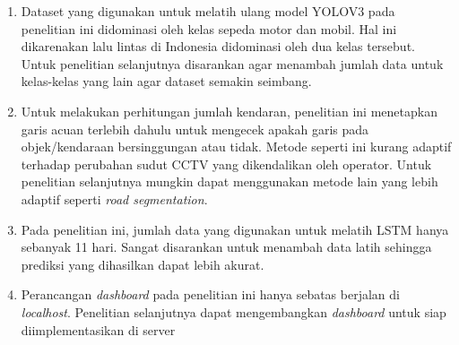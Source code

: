 \documentclass[../thesis.tex]{subfiles}
\begin{document}
\begin{enumerate}
\item Dataset yang digunakan untuk melatih ulang model YOLOV3 pada penelitian ini didominasi oleh kelas sepeda motor dan mobil. Hal ini dikarenakan lalu lintas di Indonesia didominasi oleh dua kelas tersebut. Untuk penelitian selanjutnya disarankan agar menambah jumlah data untuk kelas-kelas yang lain agar dataset semakin seimbang.
\item Untuk melakukan perhitungan jumlah kendaran, penelitian ini menetapkan garis acuan terlebih dahulu untuk mengecek apakah garis pada objek/kendaraan bersinggungan atau tidak. Metode seperti ini kurang adaptif terhadap perubahan sudut CCTV yang dikendalikan oleh operator. Untuk penelitian selanjutnya mungkin dapat menggunakan metode lain yang lebih adaptif seperti \textit{road segmentation}.
\item Pada penelitian ini, jumlah data yang digunakan untuk melatih LSTM  hanya sebanyak 11 hari. Sangat disarankan untuk menambah data latih sehingga prediksi yang dihasilkan dapat lebih akurat.
\item Perancangan \textit{dashboard} pada penelitian ini hanya sebatas berjalan di \textit{localhost}. Penelitian selanjutnya dapat mengembangkan \textit{dashboard} untuk siap diimplementasikan di server
\end{enumerate}
\end{document}
